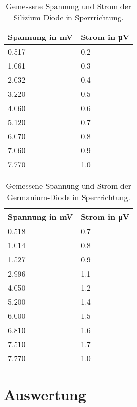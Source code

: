\documentclass[
12pt,
a4paper,
bibliography=totocnumbered, %
BCOR=1cm, %
oneside, %
]{scrartcl}
\begin{document}
\begin{table}[H]
	\centering %
	\caption{Gemessene Spannung und Strom der Silizium-Diode in Sperrrichtung.\label{tbl:SiSperr}}
	\begin{tabular}{ll}
		\toprule
		Spannung in \si{\milli\volt} & Strom in \si{\micro\volt} \\
		\midrule
		\num{0,517} & \num{0,2} \\
		\num{1,061} & \num{0,3} \\
		\num{2,032} & \num{0,4} \\
		\num{3,220} & \num{0,5} \\
		\num{4,060} & \num{0,6} \\
		\num{5,120} & \num{0,7} \\
		\num{6,070} & \num{0,8} \\
		\num{7,060} & \num{0,9} \\
		\num{7,770} & \num{1,0} \\
		\bottomrule
	\end{tabular}
\end{table}

\begin{table}[H]
	\centering %
	\caption{Gemessene Spannung und Strom der Germanium-Diode in Sperrrichtung.\label{tbl:GeSperr}}
	\begin{tabular}{ll}
		\toprule
		Spannung in \si{\milli\volt} & Strom in \si{\micro\volt} \\
		\midrule
		\num{0,518} & \num{0,7} \\
		\num{1,014} & \num{0,8} \\
		\num{1,527} & \num{0,9} \\
		\num{2,996} & \num{1,1} \\
		\num{4,050} & \num{1,2} \\
		\num{5,200} & \num{1,4} \\
		\num{6,000} & \num{1,5} \\
		\num{6,810} & \num{1,6} \\
		\num{7,510} & \num{1,7} \\
		\num{7,770} & \num{1,0} \\
		\bottomrule
	\end{tabular}
\end{table}

\section{Auswertung}
\end{document}
